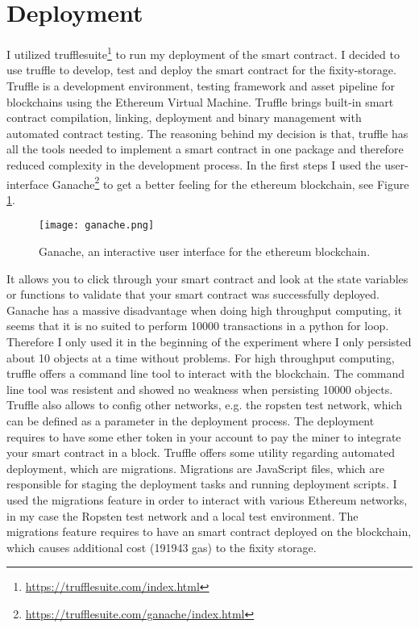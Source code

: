 \section{Deployment}
I utilized trufflesuite\footnote{\url{https://trufflesuite.com/index.html}} to run my deployment of the smart contract. I decided to use truffle to develop, test and deploy the smart contract for the fixity-storage. Truffle is a development environment, testing framework and asset pipeline for blockchains using the Ethereum Virtual Machine. Truffle brings built-in smart contract compilation, linking, deployment and binary management with automated contract testing. The reasoning behind my decision is that, truffle has all the tools needed to implement a smart contract in one package and therefore reduced complexity in the development process. In the first steps I used the user-interface Ganache\footnote{\url{https://trufflesuite.com/ganache/index.html}} to get a better feeling for the ethereum blockchain, see Figure \ref{fig:ganache}.
\begin{figure}[h]
    \label{fig:ganache}
    \caption{Ganache, an interactive user interface for the ethereum blockchain.}
    \centering
    \texttt{[image: ganache.png]}
\end{figure}
It allows you to click through your smart contract and look at the state variables or functions to validate that your smart contract was successfully deployed. Ganache has a massive disadvantage when doing high throughput computing, it seems that it is no suited to perform 10000 transactions in a python for loop. Therefore I only used it in the beginning of the experiment where I only persisted about 10 objects at a time without problems. For high throughput computing, truffle offers a command line tool to interact with the blockchain. The command line tool was resistent and showed no weakness when persisting 10000 objects.
Truffle also allows to config other networks, e.g. the ropsten test network, which can be defined as a parameter in the deployment process. The deployment requires to have some ether token in your account to pay the miner to integrate your smart contract in a block. 
Truffle offers some utility regarding automated deployment, which are migrations. Migrations are JavaScript files, which are responsible for staging the deployment tasks and running deployment scripts. I used the migrations feature in order to interact with various Ethereum networks, in my case the Ropsten test network and a local test environment. The migrations feature requires to have an smart contract deployed on the blockchain, which causes additional cost (191943 gas) to the fixity storage. 
